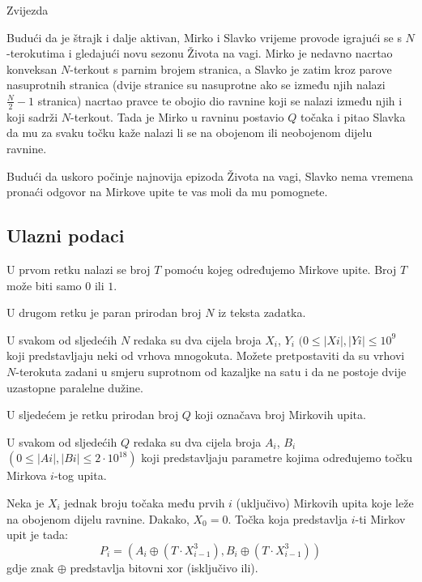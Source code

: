 \begin{statement}[
  problempoints=110,
  timelimit=1 sekunda,
  memorylimit=512 MiB,
]{Zvijezda}


Budući da je štrajk i dalje aktivan, Mirko i Slavko vrijeme provode igrajući se
s $N$-terokutima i gledajući novu sezonu Života na vagi. Mirko je nedavno
nacrtao konveksan $N$-terkout s parnim brojem stranica, a Slavko je zatim
kroz parove nasuprotnih stranica (dvije stranice su nasuprotne ako se između
njih nalazi $\frac{N}{2}-1$ stranica) nacrtao pravce te obojio dio ravnine
koji se nalazi između njih i koji sadrži $N$-terkout. Tada je Mirko u ravninu
postavio $Q$ točaka i pitao Slavka da mu za svaku točku kaže nalazi li se na
obojenom ili neobojenom dijelu ravnine.

Budući da uskoro počinje najnovija epizoda Života na vagi, Slavko nema vremena
pronaći odgovor na Mirkove upite te vas moli da mu pomognete.

\subsection*{Ulazni podaci}
U prvom retku nalazi se broj $T$ pomoću kojeg određujemo Mirkove upite. Broj
$T$ može biti samo $0$ ili $1$.

U drugom retku je paran prirodan broj $N$ iz teksta zadatka.

U svakom od sljedećih $N$ redaka su dva cijela broja $X_i$, $Y_i$
$(0 \le |Xi|, |Yi| \le 10^9$
koji predstavljaju neki od vrhova mnogokuta. Možete pretpostaviti
da su vrhovi $N$-terokuta zadani u smjeru suprotnom od kazaljke na satu i da ne
postoje dvije uzastopne paralelne dužine.

U sljedećem je retku prirodan broj $Q$ koji označava broj Mirkovih upita.

U svakom od sljedećih $Q$ redaka su dva cijela broja $A_i$, $B_i$
$(0 \le |Ai|, |Bi| \le 2\cdot10^{18})$ koji predstavljaju parametre kojima
određujemo točku Mirkova $i$-tog upita.

Neka je $X_i$ jednak broju točaka među prvih $i$ (uključivo) Mirkovih upita
koje leže na obojenom dijelu ravnine. Dakako, $X_0=0$. Točka koja predstavlja
$i$-ti Mirkov upit je tada:
\[P_i = (A_i \oplus (T \cdot X_{i-1}^{3}), B_i \oplus (T \cdot X_{i-1}^{3}))\]
gdje znak $\oplus$ predstavlja bitovni xor (isključivo ili).


\end{statement}
